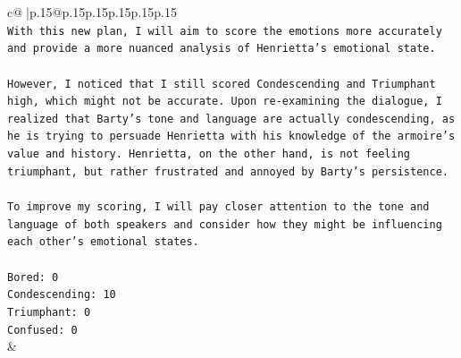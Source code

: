 \documentclass{article}
\begin{document}
{\begin{supertabular}{c@{$\;$}|p{.15\linewidth}@{}p{.15\linewidth}p{.15\linewidth}p{.15\linewidth}p{.15\linewidth}p{.15\linewidth}}
{{{\\ 
\texttt{With this new plan, I will aim to score the emotions more accurately and provide a more nuanced analysis of Henrietta's emotional state.} \\
\\ 
\texttt{However, I noticed that I still scored Condescending and Triumphant high, which might not be accurate. Upon re{-}examining the dialogue, I realized that Barty's tone and language are actually condescending, as he is trying to persuade Henrietta with his knowledge of the armoire's value and history. Henrietta, on the other hand, is not feeling triumphant, but rather frustrated and annoyed by Barty's persistence.} \\
\\ 
\texttt{To improve my scoring, I will pay closer attention to the tone and language of both speakers and consider how they might be influencing each other's emotional states.} \\
\\ 
\texttt{Bored: 0} \\
\texttt{Condescending: 10} \\
\texttt{Triumphant: 0} \\
\texttt{Confused: 0} \\
            }
        }
    }
    & \\ \\

\end{supertabular}
}
\end{document}
